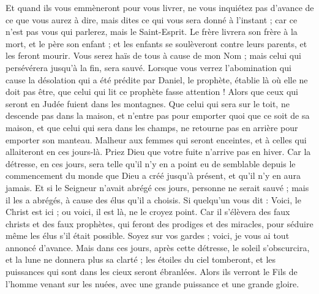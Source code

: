 \begin{multicols}{2}
Et quand ils vous emmèneront pour vous livrer, ne vous inquiétez pas d’avance de ce que vous aurez à dire, mais dites ce qui vous sera donné à l’instant ; car ce n’est pas vous qui parlerez, mais le Saint-Esprit.
Le frère livrera son frère à la mort, et le père son enfant ; et les enfants se soulèveront contre leurs parents, et les feront mourir.
Vous serez haïs de tous à cause de mon Nom ; mais celui qui persévérera jusqu’à la fin, sera sauvé.
Lorsque vous verrez l'abomination qui cause la désolation{} qui a été prédite par Daniel, le prophète, établie là où elle ne doit pas être, que celui qui lit ce prophète fasse attention ! Alors que ceux qui seront en Judée fuient dans les montagnes.
Que celui qui sera sur le toit, ne descende pas dans la maison, et n’entre pas pour emporter quoi que ce soit de sa maison,
et que celui qui sera dans les champs, ne retourne pas en arrière pour emporter son manteau.
Malheur aux femmes qui seront enceintes, et à celles qui allaiteront en ces jours-là.
Priez Dieu que votre fuite n'arrive pas en hiver.
Car la détresse, en ces jours, sera telle qu’il n’y en a point eu de semblable depuis le commencement du monde que Dieu a créé jusqu’à présent, et qu’il n’y en aura jamais.
Et si le Seigneur n’avait abrégé ces jours, personne ne serait sauvé ; mais il les a abrégés, à cause des élus qu'il a choisis.
Si quelqu'un vous dit : Voici, le Christ est ici ; ou voici, il est là, ne le croyez point.
Car il s'élèvera des faux christs et des faux prophètes, qui feront des prodiges et des miracles, pour séduire même les élus s'il était possible.
Soyez sur vos gardes ; voici, je vous ai tout annoncé d’avance.
Mais dans ces jours, après cette détresse, le soleil s’obscurcira, et la lune ne donnera plus sa clarté ;
les étoiles du ciel tomberont, et les puissances qui sont dans les cieux seront ébranlées.
Alors ils verront le Fils de l'homme venant sur les nuées, avec une grande puissance et une grande gloire.

\end{multicols}
